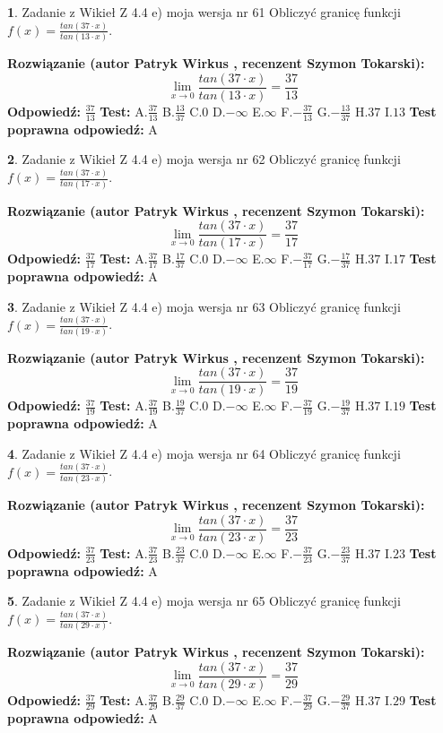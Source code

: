 \documentclass[12pt, a4paper]{article}
\theoremstyle{definition} %
\newtheorem{zad}{}
\newcommand{\zadStart}[1]{\begin{zad}#1\newline}
\newcommand{\zadStop}{\end{zad}}
\newcommand{\rozwStart}[2]{\noindent \textbf{Rozwiązanie (autor #1 , recenzent #2): }\newline}
\newcommand{\rozwStop}{\newline}
\newcommand{\odpStart}{\noindent \textbf{Odpowiedź:}\newline}
\newcommand{\odpStop}{\newline}
\newcommand{\testStart}{\noindent \textbf{Test:}\newline}
\newcommand{\testStop}{\newline}
\newcommand{\kluczStart}{\noindent \textbf{Test poprawna odpowiedź:}\newline}
\newcommand{\kluczStop}{\newline}
\begin{document}
\zadStart{Zadanie z Wikieł Z 4.4 e) moja wersja nr 61}
Obliczyć granicę funkcji $f(x)=\frac{tan(37\cdot x)}{tan(13\cdot x)}$.
\zadStop
\rozwStart{Patryk Wirkus}{Szymon Tokarski}
$$\lim\limits_{x\to 0}\frac{tan(37\cdot x)}{tan(13\cdot x)}=
\frac{37}{13}$$
\rozwStop
\odpStart
$\frac{37}{13}$
\odpStop
\testStart
A.$\frac{37}{13}$
B.$\frac{13}{37}$
C.$0$
D.$-\infty$
E.$\infty$
F.$-\frac{37}{13}$
G.$-\frac{13}{37}$
H.$37$
I.$13$
\testStop
\kluczStart
A
\kluczStop



\zadStart{Zadanie z Wikieł Z 4.4 e) moja wersja nr 62}
Obliczyć granicę funkcji $f(x)=\frac{tan(37\cdot x)}{tan(17\cdot x)}$.
\zadStop
\rozwStart{Patryk Wirkus}{Szymon Tokarski}
$$\lim\limits_{x\to 0}\frac{tan(37\cdot x)}{tan(17\cdot x)}=
\frac{37}{17}$$
\rozwStop
\odpStart
$\frac{37}{17}$
\odpStop
\testStart
A.$\frac{37}{17}$
B.$\frac{17}{37}$
C.$0$
D.$-\infty$
E.$\infty$
F.$-\frac{37}{17}$
G.$-\frac{17}{37}$
H.$37$
I.$17$
\testStop
\kluczStart
A
\kluczStop



\zadStart{Zadanie z Wikieł Z 4.4 e) moja wersja nr 63}
Obliczyć granicę funkcji $f(x)=\frac{tan(37\cdot x)}{tan(19\cdot x)}$.
\zadStop
\rozwStart{Patryk Wirkus}{Szymon Tokarski}
$$\lim\limits_{x\to 0}\frac{tan(37\cdot x)}{tan(19\cdot x)}=
\frac{37}{19}$$
\rozwStop
\odpStart
$\frac{37}{19}$
\odpStop
\testStart
A.$\frac{37}{19}$
B.$\frac{19}{37}$
C.$0$
D.$-\infty$
E.$\infty$
F.$-\frac{37}{19}$
G.$-\frac{19}{37}$
H.$37$
I.$19$
\testStop
\kluczStart
A
\kluczStop



\zadStart{Zadanie z Wikieł Z 4.4 e) moja wersja nr 64}
Obliczyć granicę funkcji $f(x)=\frac{tan(37\cdot x)}{tan(23\cdot x)}$.
\zadStop
\rozwStart{Patryk Wirkus}{Szymon Tokarski}
$$\lim\limits_{x\to 0}\frac{tan(37\cdot x)}{tan(23\cdot x)}=
\frac{37}{23}$$
\rozwStop
\odpStart
$\frac{37}{23}$
\odpStop
\testStart
A.$\frac{37}{23}$
B.$\frac{23}{37}$
C.$0$
D.$-\infty$
E.$\infty$
F.$-\frac{37}{23}$
G.$-\frac{23}{37}$
H.$37$
I.$23$
\testStop
\kluczStart
A
\kluczStop



\zadStart{Zadanie z Wikieł Z 4.4 e) moja wersja nr 65}
Obliczyć granicę funkcji $f(x)=\frac{tan(37\cdot x)}{tan(29\cdot x)}$.
\zadStop
\rozwStart{Patryk Wirkus}{Szymon Tokarski}
$$\lim\limits_{x\to 0}\frac{tan(37\cdot x)}{tan(29\cdot x)}=
\frac{37}{29}$$
\rozwStop
\odpStart
$\frac{37}{29}$
\odpStop
\testStart
A.$\frac{37}{29}$
B.$\frac{29}{37}$
C.$0$
D.$-\infty$
E.$\infty$
F.$-\frac{37}{29}$
G.$-\frac{29}{37}$
H.$37$
I.$29$
\testStop
\kluczStart
A
\kluczStop
\end{document}
